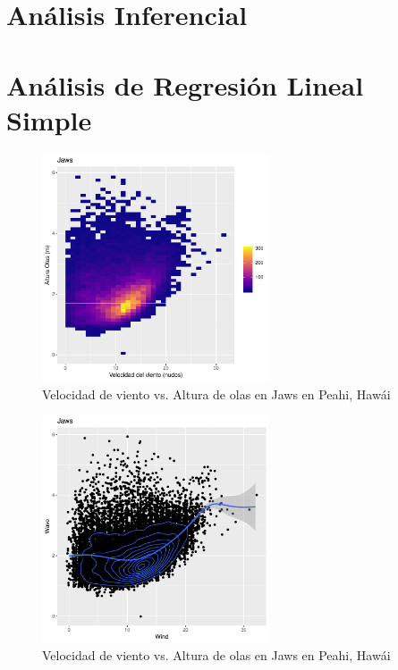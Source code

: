 \section{Análisis Inferencial}%
\label{sec:resultados}

\section{Análisis de Regresión Lineal Simple}
\label{sec:rls}



\begin{figure}[H]
\label{fig:wind_waves_jaws}
\centering
\includegraphics[width=0.6\textwidth]{./figures/jaws_bin2d.pdf}
  \caption{Velocidad de viento vs. Altura de olas en Jaws en Peahi, Hawái}
\end{figure}

\begin{figure}[H]
\label{fig:jaws_smooth}
\centering
\includegraphics[width=0.6\textwidth]{./figures/jaws_smooth.pdf}
  \caption{Velocidad de viento vs. Altura de olas en Jaws en Peahi, Hawái}
\end{figure}

